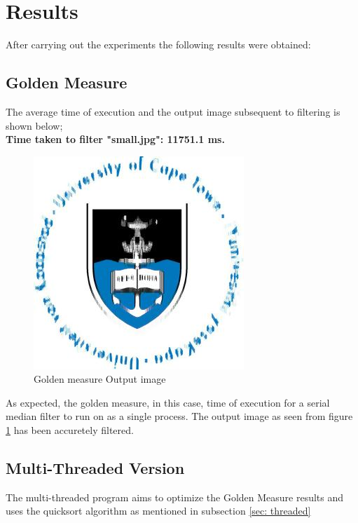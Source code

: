 \section{Results}
After carrying out the experiments the following results were obtained:

\subsection{Golden Measure}
The average time of execution and the output image subsequent to filtering is shown
below;\\

\textbf{Time taken to filter "small.jpg": 11751.1 ms.}\\

\begin{figure}[!h]
  \includegraphics[width=\linewidth]{Figures/Output1.jpg}
  \caption{Golden measure Output image}
  \label{fig:boat2}
\end{figure}
As expected, the golden measure, in this case, time of execution for a serial median filter to run
on as a single process. The output image as seen from figure \ref{fig:boat2} has been accuretely
filtered. %
\subsection{Multi-Threaded Version}
The multi-threaded program aims to optimize the Golden Measure results and uses the quicksort algorithm as mentioned in subsection \ref{sec: threaded}

